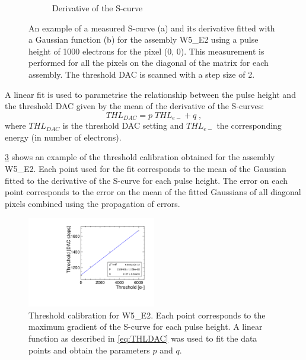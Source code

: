 \begin{figure}[htbp]
\begin{subfigure}[b]{0.45\textwidth}
    \caption{Derivative of the S-curve}
    \label{fig:deriv_example}
  \end{subfigure}
  \caption{An example of a measured S-curve (a) and its derivative
    fitted with a Gaussian function (b) for the assembly W5\_E2 using
    a pulse height of 1000 electrons for the pixel (0, 0). This
    measurement is performed for all the pixels on the diagonal of the
    matrix for each assembly. The threshold DAC is scanned with a step
    size of 2.}
  \label{fig:scurve_deriv_example}
\end{figure}

A linear fit is used to parametrise the relationship between the pulse
height and the threshold DAC given by the mean of the derivative of
the S-curves:
\begin{equation}
  THL_{DAC}=p \; THL_{e-} + q \; ,
  \label{eq:THLDAC}
\end{equation}
where $THL_{DAC}$ is the threshold DAC setting and $THL_{e-}$ the
corresponding energy (in number of electrons). 

\cref{fig:THLcalib_55-GNDGR-100} shows an example of the threshold
calibration obtained for the assembly W5\_E2. Each point used for the
fit corresponds to the mean of the Gaussian fitted to the derivative
of the S-curve for each pulse height. The error on each point
corresponds to the error on the mean of the fitted Gaussians of all
diagonal pixels combined using the propagation of errors.

\begin{figure}[htbp]
  \centering
  \includegraphics[width=0.5\textwidth]{./figures/Calibration/THLcalibration_W0005_E02.pdf}
  \caption{Threshold calibration for W5\_E2. Each point corresponds to
    the maximum gradient of the S-curve for each pulse height. A
    linear function as described in \cref{eq:THLDAC} was used to fit
    the data points and obtain the parameters $p$ and $q$.}
  \label{fig:THLcalib_55-GNDGR-100}
\end{figure}


